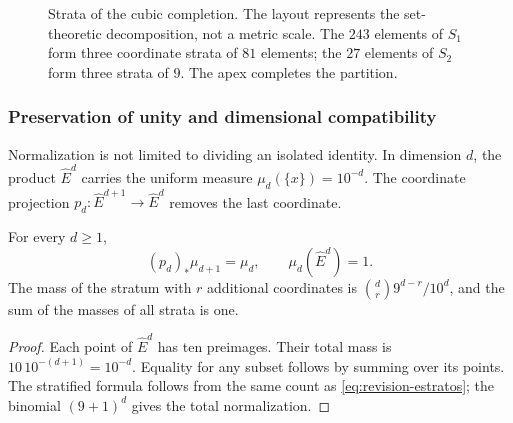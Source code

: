 \begin{figure}[htbp]
\centering
{}
\caption{Strata of the cubic completion. The layout represents
the set-theoretic decomposition, not a metric scale. The \(243\) elements
of \(S_1\) form three coordinate strata of \(81\) elements; the \(27\)
elements of \(S_2\) form three strata of \(9\). The apex completes the partition.}
\label{fig:revision-emrh}
\end{figure}



\subsubsection{Preservation of unity and dimensional compatibility}

Normalization is not limited to dividing an isolated identity. In dimension
\(d\), the product \(\widehat E^d\) carries the uniform measure
\(\mu_d(\{x\})=10^{-d}\). The coordinate projection
\(p_d:\widehat E^{d+1}\to\widehat E^d\) removes the last coordinate.

\begin{proposition}
For every \(d\geq1\),
\[
 (p_d)_*\mu_{d+1}=\mu_d,
 \qquad \mu_d(\widehat E^d)=1.
\]
The mass of the stratum with \(r\) additional coordinates is
\(\binom dr9^{d-r}/10^d\), and the sum of the masses of all strata
is one.
\end{proposition}
\begin{proof}
Each point of \(\widehat E^d\) has ten preimages. Their total mass is
\(10\,10^{-(d+1)}=10^{-d}\). Equality for any subset
follows by summing over its points. The stratified formula follows
from the same count as \eqref{eq:revision-estratos}; the binomial
\((9+1)^d\) gives the total normalization.
\end{proof}

